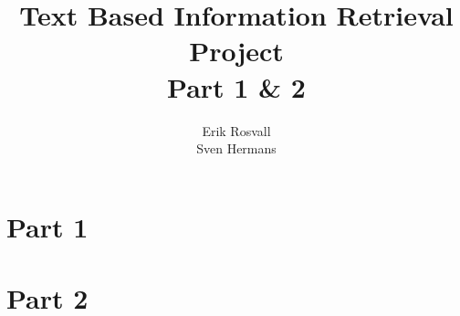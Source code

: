 \documentclass[10pt,a4paper]{report}
\author{Erik Rosvall \\ Sven Hermans}
\title{Text Based Information Retrieval \\ Project \\ Part 1 \& 2}
\begin{document}
	\maketitle
	\section*{Part 1}
\pagebreak
	\section*{Part 2}
\end{document}
